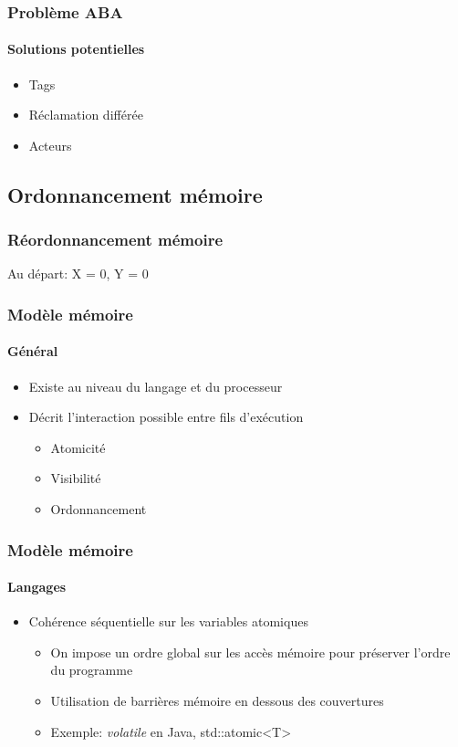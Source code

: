 \documentclass{beamer}
\begin{document}
\begin{frame}
\frametitle{Problème ABA}
\framesubtitle{Solutions potentielles}
\begin{itemize}
\item Tags
\item Réclamation différée
\item Acteurs
\end{itemize}
\end{frame}

\subsection{Ordonnancement mémoire}
\begin{frame}
\frametitle{Réordonnancement mémoire}
Au départ: X = 0, Y = 0

\end{frame}

\begin{frame}
\frametitle{Modèle mémoire}
\framesubtitle{Général}
\begin{itemize}
\item Existe au niveau du langage et du processeur
\item Décrit l'interaction possible entre fils d'exécution
\begin{itemize}
\item Atomicité
\item Visibilité
\item Ordonnancement
\end{itemize}
\end{itemize}
\end{frame}

\begin{frame}
\frametitle{Modèle mémoire}
\framesubtitle{Langages}
\begin{itemize}
\item Cohérence séquentielle sur les variables atomiques
\begin{itemize}
\item On impose un ordre global sur les accès mémoire pour préserver l'ordre du programme
\item Utilisation de barrières mémoire en dessous des couvertures
\item Exemple: \textit{volatile} en Java, std::atomic\textless T\textgreater
\end{itemize}
\end{itemize}
\end{frame}
\end{document}
